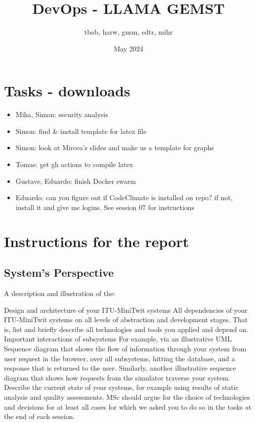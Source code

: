 \documentclass{article}
\title{DevOps - LLAMA GEMST}
\author{tbab, harw, gusm, edtr, mihr}
\date{May 2024}
\begin{document}
\maketitle

\section{Tasks - downloads}

\begin{itemize}
  \item Miha, Simon: security analysis
  \item Simon: find \& install template for latex file
  \item Simon: look at Mircea's slides and make us a template for graphs
  \item Tomas: get gh actions to compile latex
  \item Gustave, Eduardo: finish Docker swarm
  \item Eduardo: can you figure out if CodeClimate is installed on repo? if not, install it and give me logins. See session 07 for instructions
\end{itemize}

\section{Instructions for the report}
\subsection{System's Perspective}

A description and illustration of the:

Design and architecture of your ITU-MiniTwit systems
All dependencies of your ITU-MiniTwit systems on all levels of abstraction and development stages. That is, list and briefly describe all technologies and tools you applied and depend on.
Important interactions of subsystems
For example, via an illustrative UML Sequence diagram that shows the flow of information through your system from user request in the browser, over all subsystems, hitting the database, and a response that is returned to the user.
Similarly, another illustrative sequence diagram that shows how requests from the simulator traverse your system.
Describe the current state of your systems, for example using results of static analysis and quality assessments.
MSc should argue for the choice of technologies and decisions for at least all cases for which we asked you to do so in the tasks at the end of each session.
\end{document}
